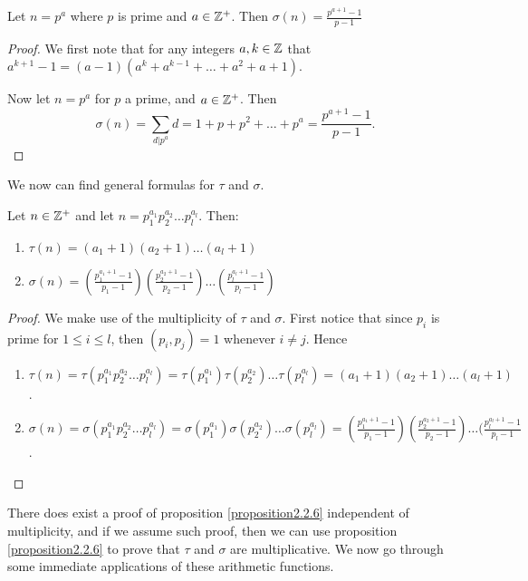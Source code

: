 \begin{lemma}\label{lemma2.2.5}
    Let $n=p^a$ where $p$ is prime and $a \in \mathbb{Z}^+$. Then $\sigma(n)=\frac{p^{a+1}-1}{p-1}$
\end{lemma}
\begin{proof}
    We first note that for any integers $a,k \in \mathbb{Z}$ that $a^{k+1}-1=(a-1)(a^k+a^{k-1}+\dots+a^2+a+1)$. 
    
    Now let $n=p^a$ for $p$ a prime, and $a \in \mathbb{Z}^+$. Then
        \begin{equation*}
            \sigma(n)=\sum_{d|p^a} d=1+p+p^2+\dots+p^a=\frac{p^{a+1}-1}{p-1}. 
        \end{equation*}
\end{proof}

We now can find general formulas for $\tau$ and $\sigma$.

\begin{proposition}\label{proposition2.2.6}
    Let $n \in \mathbb{Z}^+$ and let $n=p_1^{a_1}p_2^{a_2} \dots p_l^{a_l}$. Then:
        \begin{enumerate}[label=(\arabic*)]
            \item $\tau(n)=(a_1+1)(a_2+1) \dots (a_l+1)$
            
            \item $\sigma(n)=(\frac{p_1^{a_1+1}-1}{p_1-1})(\frac{p_2^{a_2+1}-1}{p_2-1}) \dots (\frac{p_l^{a_l+1}-1}{p_l-1})$
        \end{enumerate}
\end{proposition}
\begin{proof}
    We make use of the multiplicity of $\tau$ and $\sigma$. First notice that since $p_i$ is prime for $1 \leq i \leq l$, then  $(p_i,p_j)=1$ whenever $i \neq j$. Hence
        \begin{enumerate}[label=(\arabic*)]
            \item $\tau(n)=\tau(p_1^{a_1}p_2^{a_2} \dots p_l^{a_l})=\tau(p_1^{a_1})\tau(p_2^{a_2}) \dots \tau(p_l^{a_l})=(a_1+1)(a_2+1) \dots (a_l+1)$.
            
            \item $\sigma(n)=\sigma(p_1^{a_1}p_2^{a_2} \dots p_l^{a_l})=\sigma(p_1^{a_1})\sigma(p_2^{a_2}) \dots \sigma(p_l^{a_l})=(\frac{p_1^{a_1+1}-1}{p_1-1})(\frac{p_2^{a_2+1}-1}{p_2-1}) \dots (\frac{p_l^{a_l+1}-1}{p_l-1}$.
        \end{enumerate}
\end{proof}

There does exist a proof of proposition \ref{proposition2.2.6} independent of multiplicity, and if we assume such proof, then we can use proposition \ref{proposition2.2.6} to prove that $\tau$ and $\sigma$ are multiplicative. We now go through some immediate applications of these arithmetic functions.

